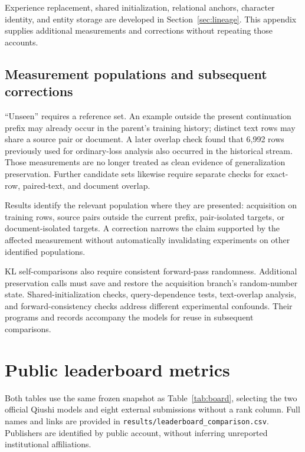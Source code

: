 Experience replacement, shared initialization, relational anchors, character identity, and entity storage are developed in Section~\ref{sec:lineage}. This appendix supplies additional measurements and corrections without repeating those accounts.

\subsection{Measurement populations and subsequent corrections}

``Unseen'' requires a reference set. An example outside the present continuation prefix may already occur in the parent's training history; distinct text rows may share a source pair or document. A later overlap check found that 6,992 rows previously used for ordinary-loss analysis also occurred in the historical stream. Those measurements are no longer treated as clean evidence of generalization preservation. Further candidate sets likewise require separate checks for exact-row, paired-text, and document overlap.

Results identify the relevant population where they are presented: acquisition on training rows, source pairs outside the current prefix, pair-isolated targets, or document-isolated targets. A correction narrows the claim supported by the affected measurement without automatically invalidating experiments on other identified populations.

KL self-comparisons also require consistent forward-pass randomness. Additional preservation calls must save and restore the acquisition branch's random-number state. Shared-initialization checks, query-dependence tests, text-overlap analysis, and forward-consistency checks address different experimental confounds. Their programs and records accompany the models for reuse in subsequent comparisons.

\par\FloatBarrier{}
\section{Public leaderboard metrics}
\label{app:board}

Both tables use the same frozen snapshot as Table~\ref{tab:board}, selecting the two official Qiushi models and eight external submissions without a rank column. Full names and links are provided in \nolinkurl{results/leaderboard_comparison.csv}. Publishers are identified by public account, without inferring unreported institutional affiliations.

